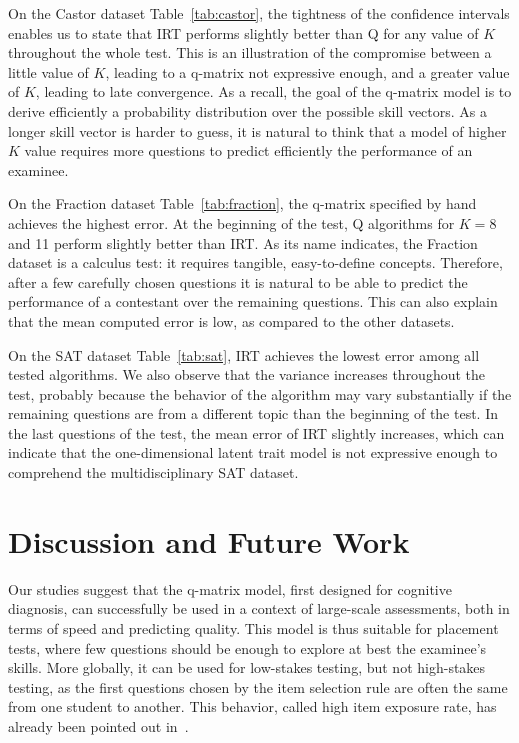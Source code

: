 \documentclass{edm_template}
\begin{document}
On the Castor dataset Table~\ref{tab:castor}, the tightness of the confidence intervals enables us to state that IRT performs slightly better than Q for any value of $K$ throughout the whole test. This is an illustration of the compromise between a little value of $K$, leading to a q-matrix not expressive enough, and a greater value of $K$, leading to late convergence. As a recall, the goal of the q-matrix model is to derive efficiently a probability distribution over the possible skill vectors. As a longer skill vector is harder to guess, it is natural to think that a model of higher $K$ value requires more questions to predict efficiently the performance of an examinee.

On the Fraction dataset Table~\ref{tab:fraction}, the q-matrix specified by hand achieves the highest error. At the beginning of the test, Q algorithms for $K = 8$ and 11 perform slightly better than IRT. As its name indicates, the Fraction dataset is a calculus test: it requires tangible, easy-to-define concepts. Therefore, after a few carefully chosen questions it is natural to be able to predict the performance of a contestant over the remaining questions. This can also explain that the mean computed error is low, as compared to the other datasets.

On the SAT dataset Table~\ref{tab:sat}, IRT achieves the lowest error among all tested algorithms. We also observe that the variance increases throughout the test, probably because the behavior of the algorithm may vary substantially if the remaining questions are from a different topic than the beginning of the test. In the last questions of the test, the mean error of IRT slightly increases, which can indicate that the one-dimensional latent trait model is not expressive enough to comprehend the multidisciplinary SAT dataset.

\section{Discussion and Future Work}

Our studies suggest that the q-matrix model, first designed for cognitive diagnosis, can successfully be used in a context of large-scale assessments, both in terms of speed and predicting quality. This model is thus suitable for placement tests, where few questions should be enough to explore at best the examinee's skills. More globally, it can be used for low-stakes testing, but not high-stakes testing, as the first questions chosen by the item selection rule are often the same from one student to another. This behavior, called high item exposure rate, has already been pointed out in~\cite{Cheng2009}.
\end{document}
